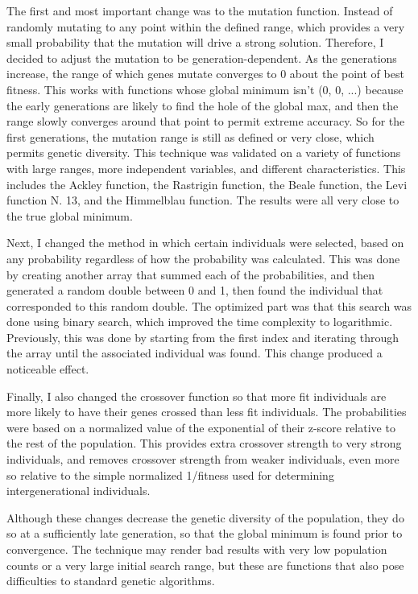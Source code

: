 \documentclass[12pt]{article}
\begin{document}
The first and most important change was to the mutation function. Instead of randomly mutating to any point within the defined range, which provides a very small probability that the mutation will drive a strong solution. Therefore, I decided to adjust the mutation to be generation-dependent. As the generations increase, the range of which genes mutate converges to 0 about the point of best fitness. This works with functions whose global minimum isn't (0, 0, ...) because the early generations are likely to find the hole of the global max, and then the range slowly converges around that point to permit extreme accuracy. So for the first generations, the mutation range is still as defined or very close, which permits genetic diversity. This technique was validated on a variety of functions with large ranges, more independent variables, and different characteristics. This includes the Ackley function, the Rastrigin function, the Beale function, the Levi function N. 13, and the Himmelblau function. The results were all very close to the true global minimum.

Next, I changed the method in which certain individuals were selected, based on any probability regardless of how the probability was calculated. This was done by creating another array that summed each of the probabilities, and then generated a random double between 0 and 1, then found the individual that corresponded to this random double. The optimized part was that this search was done using binary search, which improved the time complexity to logarithmic. Previously, this was done by starting from the first index and iterating through the array until the associated individual was found. This change produced a noticeable effect.

Finally, I also changed the crossover function so that more fit individuals are more likely to have their genes crossed than less fit individuals. The probabilities were based on a normalized value of the exponential of their z-score relative to the rest of the population. This provides extra crossover strength to very strong individuals, and removes crossover strength from weaker individuals, even more so relative to the simple normalized 1/fitness used for determining intergenerational individuals.

Although these changes decrease the genetic diversity of the population, they do so at a sufficiently late generation, so that the global minimum is found prior to convergence. The technique may render bad results with very low population counts or a very large initial search range, but these are functions that also pose difficulties to standard genetic algorithms.
\end{document}
